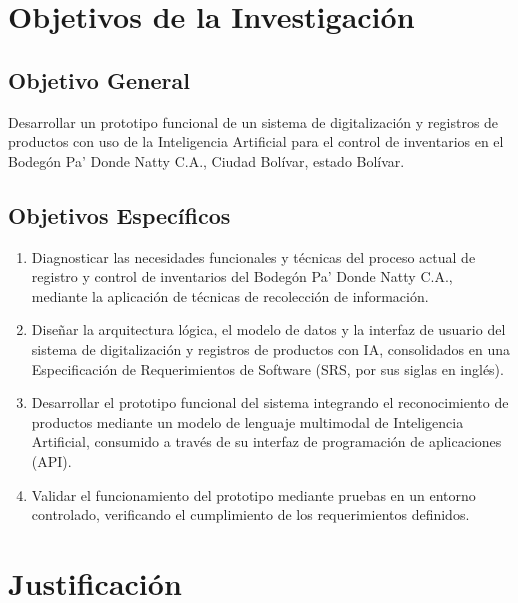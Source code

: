 \documentclass[12pt, letterpaper]{report}
\begin{document}
\section{Objetivos de la Investigación}

\subsection{Objetivo General}

Desarrollar un prototipo funcional de un sistema de digitalización y
registros de productos con uso de la Inteligencia Artificial para el
control de inventarios en el Bodegón Pa' Donde Natty C.A., Ciudad
Bolívar, estado Bolívar.

\subsection{Objetivos Específicos}

\begin{enumerate}
  \item Diagnosticar las necesidades funcionales y técnicas del proceso
        actual de registro y control de inventarios del Bodegón Pa'
        Donde Natty C.A., mediante la aplicación de técnicas de
        recolección de información.

  \item Diseñar la arquitectura lógica, el modelo de datos y la
        interfaz de usuario del sistema de digitalización y registros
        de productos con IA, consolidados en una Especificación de
        Requerimientos de Software (SRS, por sus siglas en inglés).

  \item Desarrollar el prototipo funcional del sistema integrando el
        reconocimiento de productos mediante un modelo de lenguaje
        multimodal de Inteligencia Artificial, consumido a través de su
        interfaz de programación de aplicaciones (API).

  \item Validar el funcionamiento del prototipo mediante pruebas en un
        entorno controlado, verificando el cumplimiento de los
        requerimientos definidos.
\end{enumerate}

\section{Justificación}
\end{document}
